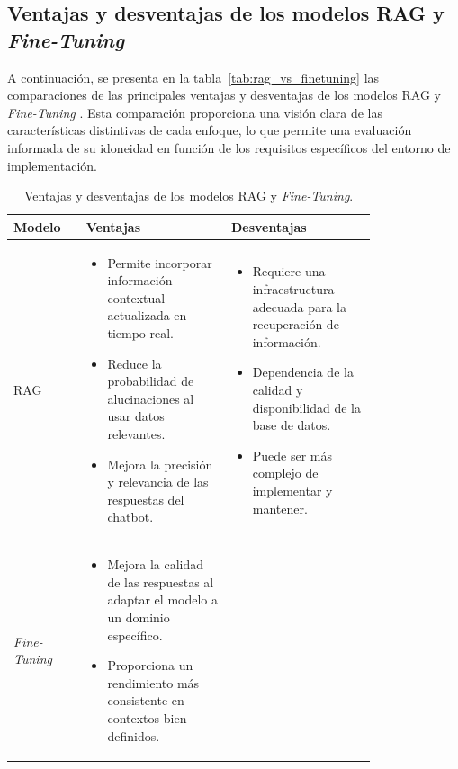   \newpage
\subsection{Ventajas y desventajas de los modelos RAG y \textit{Fine-Tuning}}

  A continuación, se presenta en la tabla~\ref{tab:rag_vs_finetuning} las comparaciones de las principales ventajas y desventajas de los modelos RAG y \textit{Fine-Tuning} \cite{greyling2023}. Esta comparación proporciona una visión clara de las características distintivas de cada enfoque, lo que permite una evaluación informada de su idoneidad en función de los requisitos específicos del entorno de implementación.

    \begin{table}[ht]
        \centering
        \caption{Ventajas y desventajas de los modelos RAG y \textit{Fine-Tuning}.}
        \begin{tabular}{l p{0.4\linewidth} p{0.4\linewidth}}
            \toprule
            \textbf{Modelo} & \textbf{Ventajas} & \textbf{Desventajas} \\
            \midrule
            RAG &
            \begin{itemize}
                \item Permite incorporar información contextual actualizada en tiempo real.
                \item Reduce la probabilidad de alucinaciones al usar datos relevantes.
                \item Mejora la precisión y relevancia de las respuestas del chatbot.
            \end{itemize} &
            \begin{itemize}
                \item Requiere una infraestructura adecuada para la recuperación de información.
                \item Dependencia de la calidad y disponibilidad de la base de datos.
                \item Puede ser más complejo de implementar y mantener.
            \end{itemize} \\
            \midrule
            \textit{Fine-Tuning} &
            \begin{itemize}
                \item Mejora la calidad de las respuestas al adaptar el modelo a un dominio específico.
                \item Proporciona un rendimiento más consistente en contextos bien definidos.

\end{itemize}
\end{tabular}
\end{table}
